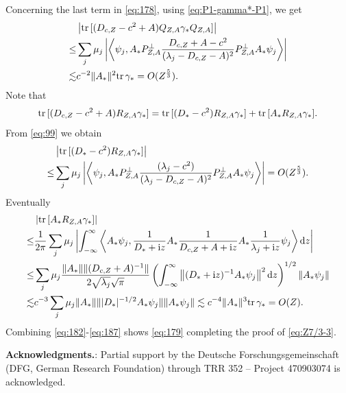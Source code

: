\documentclass[a4paper]{amsart}
\def\tr{{\rm tr \,}}
\def\rd{\mathrm{d}}
\def\ri{\mathrm{i}}
\begin{document}
Concerning the last term in \eqref{eq:178}, using
\eqref{eq:P1-gamma*-P1}, we get
\begin{equation}\label{eq:184}
    \begin{split}
      &\left|\tr[(D_{c,Z}-c^2+A) Q_{Z,A}\gamma_* Q_{Z,A}]\right|\\
      \leq & \sum_{j}\mu_j\left|\left<\psi_j,A_*P_{Z,A}^{\perp}\frac{D_{c,Z}+A-c^2}{(\lambda_j-D_{c,Z}-A)^2}  P_{Z,A}^{\perp}  A_*\psi_j\right>\right|\\
      \lesssim& c^{-2}\|A_*\|^2 \tr\gamma_* =O(Z^\frac53).
    \end{split}
\end{equation}
Note that
\begin{equation}\label{eq:185}
    \tr[(D_{c,Z}-c^2+A) R_{Z,A}\gamma_*]= \tr[(D_*-c^2) R_{Z,A}\gamma_*]+ \tr[A_* R_{Z,A}\gamma_*].
\end{equation}
From \eqref{eq:99} we obtain
\begin{equation}\label{eq:186}
\begin{split}
  & \left|\tr[(D_*-c^2) R_{Z,A}\gamma_*]\right|\\
  \leq& \sum_{j}\mu_j  \left|\left<\psi_j, A_*  P_{Z,A}^{\perp}\frac{(\lambda_j-c^2)}{(\lambda_j-D_{c,Z}-A)^2} P_{Z,A}^{\perp} A_* \psi_j \right>\right| =O(Z^\frac53).
\end{split}
\end{equation}
Eventually
\begin{equation}\label{eq:187}
   \begin{split}
     &\left|\tr[A_*  R_{Z,A}\gamma_*]\right|\\
     \leq & \frac{1}{2\pi}\sum_j \mu_j \left|\int_{-\infty}^{\infty}\left<A_*\psi_j,\frac{1}{D_*+\ri z}A_*\frac{1}{D_{c,Z}+A+\ri z}A_*\frac{1}{\lambda_j+\ri z} \psi_j\right> \rd z \right|\\
     \leq &\sum_j\mu_j \frac{\|A_*\|\|(D_{c,Z}+A)^{-1}\|}{2\sqrt{\lambda_j} \sqrt{\pi}}\left(\int_{-\infty}^\infty \left\|(D_*+\ri z)^{-1} A_*\psi_j\right\|^2 \rd z\right)^{1/2}\|A_*\psi_j\|\\
     \lesssim & c^{-3}  \sum_j \mu_j\|A_*\|\||D_*|^{-1/2}A_*\psi_j\|\|A_*\psi_j\|\lesssim c^{-4}\|A_*\|^3\tr\gamma_*= O(Z).
   \end{split}
\end{equation}
Combining \eqref{eq:182}-\eqref{eq:187} shows \eqref{eq:179} 
completing the proof of \eqref{eq:Z7/3-3}.

\bigskip

{\bf Acknowledgments.}: Partial support by the Deutsche
Forschungsgemeinschaft (DFG, German Research Foundation) through TRR
352 -- Project 470903074 is acknowledged.\medskip
\end{document}
